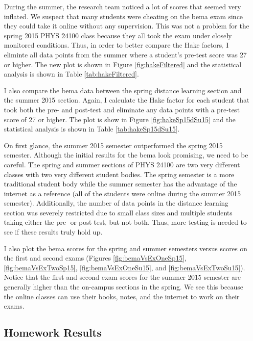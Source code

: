 During the summer, the research team noticed a lot of scores that seemed very inflated. We suspect that many students were cheating on the \gls{bema} exam since they could take it online without any supervision. This was not a problem for the spring 2015 PHYS 24100 class because they all took the exam under closely monitored conditions. Thus, in order to better compare the Hake factors, I eliminte all data points from the summer where a student's pre-test score was 27 or higher. The new plot is shown in Figure \ref{fig:hakeFiltered} and the statistical analysis is shown in Table \ref{tab:hakeFiltered}.

I also compare the \gls{bema} data between the spring distance learning section and the summer 2015 section. Again, I calculate the Hake factor for each student that took both the pre- and post-test and eliminate any data points with a pre-test score of 27 or higher. The plot is show in Figure \ref{fig:hakeSp15dSu15} and the statistical analysis is shown in Table \ref{tab:hakeSp15dSu15}.

On first glance, the summer 2015 semester outperformed the spring 2015 semester. Although the initial results for the \gls{bema} look promising, we need to be careful. The spring and summer sections of PHYS 24100 are two very different classes with two very different student bodies. The spring semester is a more traditional student body while the summer semester has the advantage of the internet as a reference (all of the students were online during the summer 2015 semester). Additionally, the number of data points in the distance learning section was severely restricted due to small class sizes and multiple students taking either the pre- or post-test, but not both. Thus, more testing is needed to see if these results truly hold up.

I also plot the \gls{bema} scores for the spring and summer semesters versus scores on the first and second exams (Figures \ref{fig:bemaVsExOneSp15}, \ref{fig:bemaVsExTwoSp15}, \ref{fig:bemaVsExOneSu15}, and \ref{fig:bemaVsExTwoSu15}). Notice that the first and second exam scores for the summer 2015 semester are generally higher than the on-campus sections in the spring. We see this because the online classes can use their books, notes, and the internet to work on their exams.

\subsection{Homework Results}

